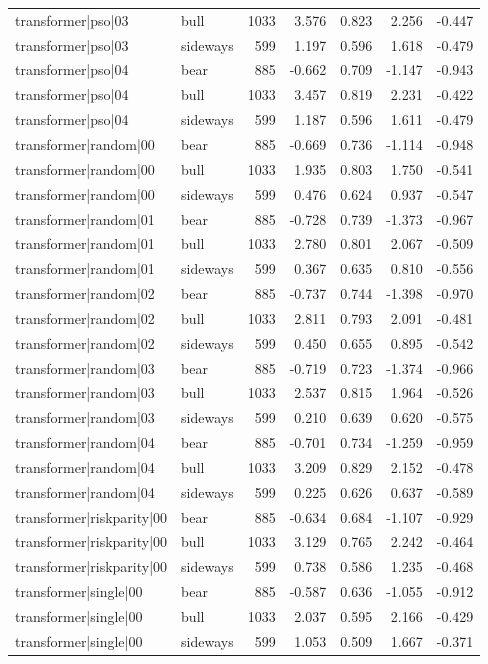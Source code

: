 \begin{table}
\begin{tabular}{llrrrrr}
transformer|pso|03 & bull & 1033 & 3.576 & 0.823 & 2.256 & -0.447 \\
transformer|pso|03 & sideways & 599 & 1.197 & 0.596 & 1.618 & -0.479 \\
transformer|pso|04 & bear & 885 & -0.662 & 0.709 & -1.147 & -0.943 \\
transformer|pso|04 & bull & 1033 & 3.457 & 0.819 & 2.231 & -0.422 \\
transformer|pso|04 & sideways & 599 & 1.187 & 0.596 & 1.611 & -0.479 \\
transformer|random|00 & bear & 885 & -0.669 & 0.736 & -1.114 & -0.948 \\
transformer|random|00 & bull & 1033 & 1.935 & 0.803 & 1.750 & -0.541 \\
transformer|random|00 & sideways & 599 & 0.476 & 0.624 & 0.937 & -0.547 \\
transformer|random|01 & bear & 885 & -0.728 & 0.739 & -1.373 & -0.967 \\
transformer|random|01 & bull & 1033 & 2.780 & 0.801 & 2.067 & -0.509 \\
transformer|random|01 & sideways & 599 & 0.367 & 0.635 & 0.810 & -0.556 \\
transformer|random|02 & bear & 885 & -0.737 & 0.744 & -1.398 & -0.970 \\
transformer|random|02 & bull & 1033 & 2.811 & 0.793 & 2.091 & -0.481 \\
transformer|random|02 & sideways & 599 & 0.450 & 0.655 & 0.895 & -0.542 \\
transformer|random|03 & bear & 885 & -0.719 & 0.723 & -1.374 & -0.966 \\
transformer|random|03 & bull & 1033 & 2.537 & 0.815 & 1.964 & -0.526 \\
transformer|random|03 & sideways & 599 & 0.210 & 0.639 & 0.620 & -0.575 \\
transformer|random|04 & bear & 885 & -0.701 & 0.734 & -1.259 & -0.959 \\
transformer|random|04 & bull & 1033 & 3.209 & 0.829 & 2.152 & -0.478 \\
transformer|random|04 & sideways & 599 & 0.225 & 0.626 & 0.637 & -0.589 \\
transformer|riskparity|00 & bear & 885 & -0.634 & 0.684 & -1.107 & -0.929 \\
transformer|riskparity|00 & bull & 1033 & 3.129 & 0.765 & 2.242 & -0.464 \\
transformer|riskparity|00 & sideways & 599 & 0.738 & 0.586 & 1.235 & -0.468 \\
transformer|single|00 & bear & 885 & -0.587 & 0.636 & -1.055 & -0.912 \\
transformer|single|00 & bull & 1033 & 2.037 & 0.595 & 2.166 & -0.429 \\
transformer|single|00 & sideways & 599 & 1.053 & 0.509 & 1.667 & -0.371 \\
\bottomrule
\end{tabular}
\end{table}

